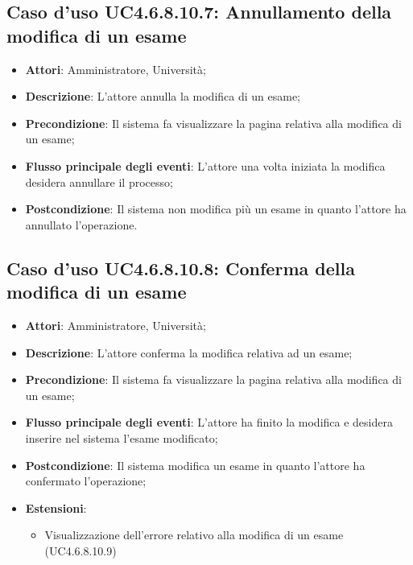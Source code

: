 \subsection{Caso d'uso \texorpdfstring{UC4.6.8.10.7}{UC4.6.8.10.7}: Annullamento della modifica di un esame}
\begin{itemize}
\item \textbf{Attori}: Amministratore, Università;
\item \textbf{Descrizione}: L'attore annulla la modifica di un esame;

\item \textbf{Precondizione}: Il sistema fa visualizzare la pagina relativa alla modifica di un esame;


\item \textbf{Flusso principale degli eventi}: L'attore una volta iniziata la modifica desidera annullare il processo;

\item \textbf{Postcondizione}: Il sistema non modifica più un esame in quanto l'attore ha annullato l'operazione.


\end{itemize}
\subsection{Caso d'uso \texorpdfstring{UC4.6.8.10.8}{UC4.6.8.10.8}: Conferma della modifica di un esame}
\begin{itemize}
\item \textbf{Attori}: Amministratore, Università;
\item \textbf{Descrizione}: L'attore conferma la modifica relativa ad un esame;

\item \textbf{Precondizione}: Il sistema fa visualizzare la pagina relativa alla modifica di un esame;

\item \textbf{Flusso principale degli eventi}: L'attore ha finito la modifica e desidera inserire nel sistema l'esame modificato;

\item \textbf{Postcondizione}: Il sistema modifica un esame in quanto l'attore ha confermato l'operazione;


\item \textbf{Estensioni}:
\begin{itemize}
\item Visualizzazione dell'errore relativo alla modifica di un esame (UC4.6.8.10.9)
\end{itemize}
\end{itemize}
